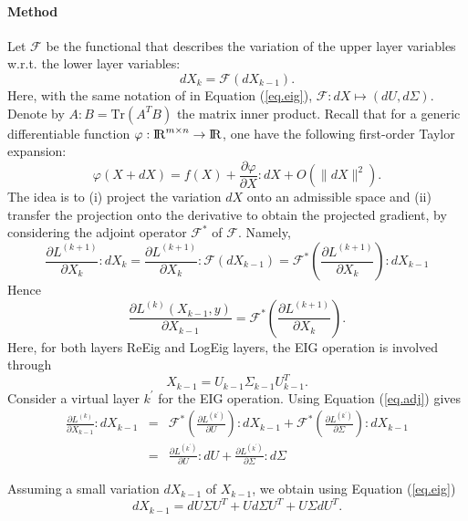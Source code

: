 \documentclass[10pt,a4paper]{book}
\theoremstyle{definition}
\theoremstyle{plain}
\theoremstyle{remark}
\def\R{{\rm I\kern-0.16em R}}
\begin{document}
\paragraph{Method}
Let $\mathcal{F}$ be the functional that describes the variation of the upper layer variables w.r.t. the lower layer variables:
$$dX_k=\mathcal{F}(dX_{k-1}).$$
Here, with the same notation of in Equation (\ref{eq.eig}), $\mathcal{F}: dX \mapsto (dU,d\Sigma)$.
\\ Denote by $A:B=\text{Tr}(A^{T}B)$ the matrix inner product. Recall that for a generic differentiable function $\varphi: \R^{m\times n}\to \R$, one have the following first-order Taylor expansion:
$$\varphi(X+dX)=f(X)+\frac{\partial \varphi}{\partial X}: dX+O(\|dX\|^2).$$
The idea is to (i) project the variation $dX$ onto an admissible space and (ii) transfer the projection onto the derivative to obtain the projected gradient, by considering the adjoint operator $\mathcal{F}^{\ast}$ of $\mathcal{F}$. Namely,
\[
\frac{\partial L^{(k+1)}}{\partial X_k}: dX_k =\frac{\partial L^{(k+1)}}{\partial X_k}: \mathcal{F}(dX_{k-1})= \mathcal{F}^{\ast}\left(\frac{\partial L^{(k+1)}}{\partial X_k} \right) : dX_{k-1}
\]
Hence
\begin{equation} \label{eq.adj}
\frac{\partial L^{(k)}(X_{k-1},y)}{\partial X_{k-1}}=\mathcal{F}^{\ast}\left(\frac{\partial L^{(k+1)}}{\partial X_k} \right).
\end{equation}
Here, for both layers ReEig and LogEig layers, the EIG operation is involved through
$$X_{k-1}=U_{k-1}\Sigma_{k-1}U_{k-1}^{T}.$$
Consider a virtual layer $k^{\prime}$ for the EIG operation. Using Equation (\ref{eq.adj}) gives
\begin{eqnarray}
\frac{\partial L^{(k)}}{\partial X_{k-1}}:dX_{k-1}&=&\mathcal{F}^{\ast}\left(\frac{\partial L^{(k^{\prime})}}{\partial U} \right): dX_{k-1}+\mathcal{F}^{\ast}\left(\frac{\partial L^{(k^{\prime})}}{\partial \Sigma} \right):dX_{k-1}\\
\label{eq.com.adj}
&=&\frac{\partial L^{(k^{\prime})}}{\partial U}:dU+ \frac{\partial L^{(k^{\prime})}}{\partial \Sigma}:d\Sigma
\end{eqnarray}



Assuming a small variation $dX_{k-1}$ of $X_{k-1}$, we obtain using Equation (\ref{eq.eig})
$$
dX_{k-1}=dU\Sigma U^T+Ud\Sigma U^T+U\Sigma dU^T.
$$
\end{document}
